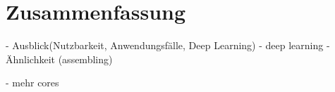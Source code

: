 \chapter{Zusammenfassung}

 - Ausblick(Nutzbarkeit, Anwendungsfälle, Deep Learning)
 - deep learning - Ähnlichkeit (assembling)

 - mehr cores
